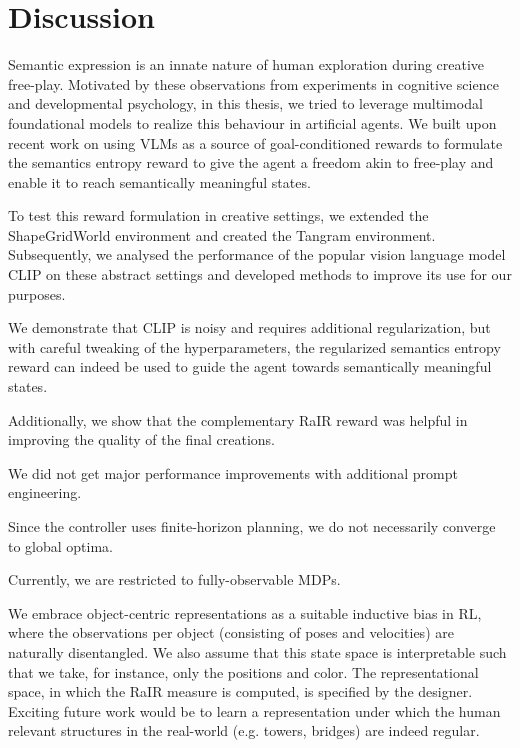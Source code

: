 \chapter{Discussion}
\label{sec:discussion}

Semantic expression is an innate nature of human exploration during creative free-play.
Motivated by these observations from experiments in cognitive science and developmental psychology, in this thesis, we tried to leverage multimodal foundational models to realize this behaviour in artificial agents.
We built upon recent work on using VLMs as a source of goal-conditioned rewards to formulate the semantics entropy reward to give the agent a freedom akin to free-play and enable it to reach semantically meaningful states.

To test this reward formulation in creative settings, we extended the ShapeGridWorld environment and created the Tangram environment.
Subsequently, we analysed the performance of the popular vision language model CLIP on these abstract settings and developed methods to improve its use for our purposes.

We demonstrate that CLIP is noisy and requires additional regularization, but with careful tweaking of the hyperparameters, the regularized semantics entropy reward can indeed be used to guide the agent towards semantically meaningful states.

Additionally, we show that the complementary RaIR reward was helpful in improving the quality of the final creations.

We did not get major performance improvements with additional prompt engineering.

Since the controller uses finite-horizon planning, we do not necessarily converge to global optima.


Currently, we are restricted to fully-observable MDPs.

We embrace object-centric representations as a suitable inductive bias in RL, where the observations per object (consisting of poses and velocities) are naturally disentangled. We also assume that this state space is interpretable such that we take, for instance, only the positions and color. The representational space, in which the RaIR measure
is computed, is specified by the designer. Exciting future work would be to learn a representation under which the human relevant structures in the real-world (e.g. towers, bridges) are indeed regular.





